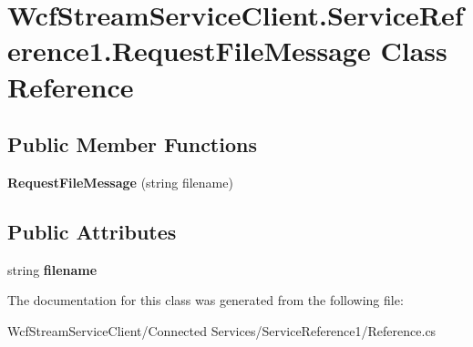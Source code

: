 \hypertarget{class_wcf_stream_service_client_1_1_service_reference1_1_1_request_file_message}{}\section{Wcf\+Stream\+Service\+Client.\+Service\+Reference1.\+Request\+File\+Message Class Reference}
\label{class_wcf_stream_service_client_1_1_service_reference1_1_1_request_file_message}
\subsection*{Public Member Functions}
\begin{DoxyCompactItemize}
\item 
\mbox{\label{class_wcf_stream_service_client_1_1_service_reference1_1_1_request_file_message_aeff121fb231186e34db38ab72011d93e}} 
{\bfseries Request\+File\+Message} (string filename)
\end{DoxyCompactItemize}
\subsection*{Public Attributes}
\begin{DoxyCompactItemize}
\item 
\mbox{\label{class_wcf_stream_service_client_1_1_service_reference1_1_1_request_file_message_afdf8ea5f9c1294b192b0e4433f0f2f2b}} 
string {\bfseries filename}
\end{DoxyCompactItemize}


The documentation for this class was generated from the following file\+:\begin{DoxyCompactItemize}
\item 
Wcf\+Stream\+Service\+Client/\+Connected Services/\+Service\+Reference1/Reference.\+cs\end{DoxyCompactItemize}

